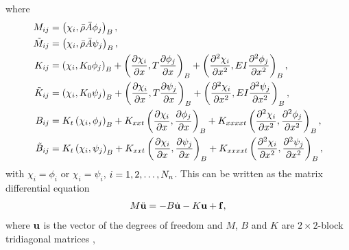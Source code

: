 \documentclass[11pt]{article}
\newcommand{\rhos}{\bar{\rho}}
\newcommand{\As}{\bar{A}}
\begin{document}
where 
\begin{align}
  M_{ij} &= \left( \chi_i,  \rhos \As \phi_j \right)_B , \\
  \Mt_{ij} &= \left( \chi_i,  \rhos \As \psi_j \right)_B , \\
% 
  K_{ij} &= 
             \left( \chi_i , K_0 \phi_j \right)_B
            + \left( \frac{\partial \chi_i}{\partial x} , T \frac{\partial \phi_j}{\partial x} \right)_B
               + \left(\frac{\partial^2 \chi_i}{\partial x^2}, E I \frac{\partial^2 \phi_j}{\partial x^2}\right)_B, \\
  \Kt_{ij} &= \left( \chi_i , K_0 \psi_j \right)_B
                + \left( \frac{\partial \chi_i}{\partial x} , T \frac{\partial \psi_j}{\partial x} \right)_B
                + \left(\frac{\partial^2 \chi_i}{\partial x^2}, E I \frac{\partial^2 \psi_j}{\partial x^2}\right)_B, \\
% 
  B_{ij} &=  K_t \left( \chi_i , \phi_j \right)_B
            + K_{xxt} \left( \frac{\partial \chi_i}{\partial x} , \frac{\partial \phi_j}{\partial x} \right)_B 
            + K_{xxxxt} \left(\frac{\partial^2 \chi_i}{\partial x^2}, \frac{\partial^2 \phi_j}{\partial x^2}\right)_B, \\
% 
  \Bt_{ij} &=  K_t \left( \chi_i , \psi_j \right)_B
            + K_{xxt} \left( \frac{\partial \chi_i}{\partial x} , \frac{\partial \psi_j}{\partial x} \right)_B
            + K_{xxxxt} \left(\frac{\partial^2 \chi_i}{\partial x^2}, \frac{\partial^2 \psi_j}{\partial x^2}\right)_B ,  
\end{align}
with $\chi_i=\phi_i$ or $\chi_i=\psi_i$, $i=1,2,\ldots,N_n$.
This can be written as the matrix differential equation
\begin{align}
   M \ddot{\mathbf{ u}} = - B \dot{\mathbf{ u}} - K \mathbf{ u} + \mathbf{ f} , \label{eq:beamODE}
\end{align}
where $\mathbf{ u}$ is the vector of the degrees of freedom and 
$M$, $B$ and $K$ are $2\times2$-block tridiagonal matrices , 
\end{document}
